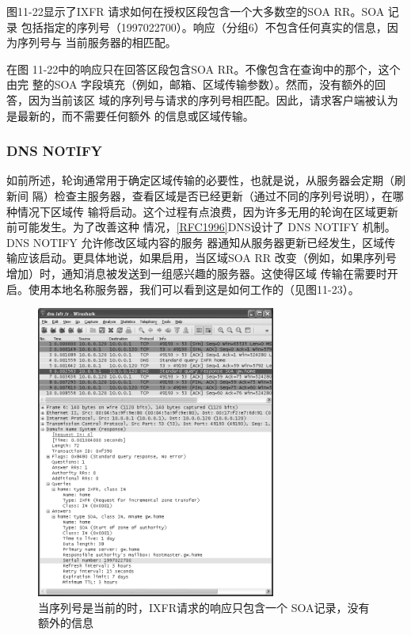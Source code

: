 图11-22显示了IXFR 请求如何在授权区段包含一个大多数空的SOA RR。SOA 记录
包括指定的序列号（1997022700）。响应（分组6）不包含任何真实的信息，因为序列号与
当前服务器的相匹配。

在图 11-22中的响应只在回答区段包含SOA RR。不像包含在查询中的那个，这个由完
整的SOA 字段填充（例如，邮箱、区域传输参数）。然而，没有额外的回答，因为当前该区
域的序列号与请求的序列号相匹配。因此，请求客户端被认为是最新的，而不需要任何额外
的信息或区域传输。

\subsubsection{DNS NOTIFY}

如前所述，轮询通常用于确定区域传输的必要性，也就是说，从服务器会定期（刷新间
隔）检查主服务器，查看区域是否已经更新（通过不同的序列号说明），在哪种情况下区域传
输将启动。这个过程有点浪费，因为许多无用的轮询在区域更新前可能发生。为了改善这种
情况，\href{https://www.rfc-editor.org/rfc/rfc1996}{[RFC1996]}DNS设计了 DNS
NOTIFY 机制。DNS NOTIFY 允许修改区域内容的服务
器通知从服务器更新已经发生，区域传输应该启动。更具体地说，如果启用，当区域SOA
RR 改变（例如，如果序列号增加）时，通知消息被发送到一组感兴趣的服务器。这使得区域
传输在需要时开启。使用本地名称服务器，我们可以看到这是如何工作的（见图11-23）。

\begin{figure}[!htb]
  \centering
  \includegraphics[width=0.7\textwidth]{imgs/11/11-22.png}
  \caption{当序列号是当前的时，IXFR请求的响应只包含一个 SOA记录，没有额外的信息}
\end{figure}

